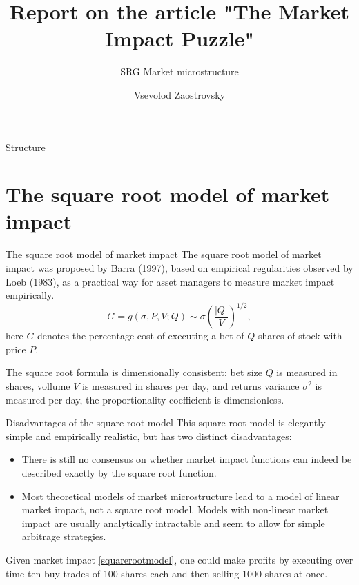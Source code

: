 \documentclass[aspectratio=169]{beamer}
\title{Report on the article "The Market Impact Puzzle"}
\subtitle{SRG Market microstructure}
\author{Vsevolod Zaostrovsky}
\institute{Vega Institute Foundation}
\begin{document}
\maketitle

\begin{frame}{Structure}
    \tableofcontents
\end{frame}

\section{The square root model of market impact}
\begin{frame}{The square root model of market impact}
    The square root model of market impact was proposed by Barra (1997), based on empirical
    regularities observed by Loeb (1983), as a practical way for asset managers to measure market
    impact empirically.
    \begin{equation} \label{squarerootmodel}
        G = g(\sigma, P, V; Q) \sim \sigma \left(\frac{|Q|}{V}\right)^{1/2},
    \end{equation}
    here $G$ denotes the percentage cost of executing a
    bet of $Q$ shares of stock with price $P$. \par
    The square root formula is dimensionally consistent: bet size $Q$ is measured in shares, vollume
    $V$ is measured in shares per day, and returns variance $\sigma^2$
    is measured per day, the proportionality coefficient is dimensionless.
\end{frame}

\begin{frame}{Disadvantages of the square root model}
    This square root model is elegantly simple and empirically realistic, but
    has two distinct disadvantages:
    \begin{itemize}
        \item There is still no consensus on whether market impact
              functions can indeed be described exactly by the square root function.
        \item Most theoretical models of market microstructure lead
              to a model of linear market impact, not a square root model. Models with non-linear market impact
              are usually analytically intractable and seem to allow for simple arbitrage strategies.
    \end{itemize}
    \begin{example}
        Given market impact \ref{squarerootmodel}, one could make profits by
        executing over time ten buy trades of 100 shares each and then selling 1000 shares at once.
    \end{example}
\end{frame}
\end{document}
